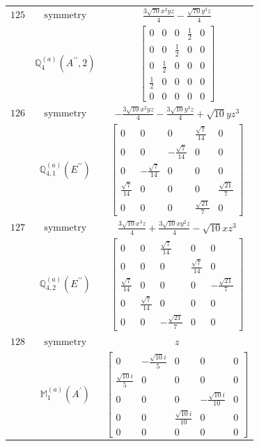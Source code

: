\documentclass[fleqn,8pt,landscape]{jsarticle}
\begin{document}
\begin{longtable}{ccc}
$ 125 $ & $ \text{symmetry} $ & $ \frac{3 \sqrt{70} x^{2} y z}{4} - \frac{\sqrt{70} y^{3} z}{4} $ \\
$  $ & $ \mathbb{Q}_{4}^{(a)}(A^{\prime\prime},2) $ & $ \begin{bmatrix} 0 & 0 & 0 & \frac{1}{2} & 0 \\ 0 & 0 & \frac{1}{2} & 0 & 0 \\ 0 & \frac{1}{2} & 0 & 0 & 0 \\ \frac{1}{2} & 0 & 0 & 0 & 0 \\ 0 & 0 & 0 & 0 & 0 \end{bmatrix} $ \\ \hline
$ 126 $ & $ \text{symmetry} $ & $ - \frac{3 \sqrt{10} x^{2} y z}{4} - \frac{3 \sqrt{10} y^{3} z}{4} + \sqrt{10} y z^{3} $ \\
$  $ & $ \mathbb{Q}_{4,1}^{(a)}(E^{\prime\prime}) $ & $ \begin{bmatrix} 0 & 0 & 0 & \frac{\sqrt{7}}{14} & 0 \\ 0 & 0 & - \frac{\sqrt{7}}{14} & 0 & 0 \\ 0 & - \frac{\sqrt{7}}{14} & 0 & 0 & 0 \\ \frac{\sqrt{7}}{14} & 0 & 0 & 0 & \frac{\sqrt{21}}{7} \\ 0 & 0 & 0 & \frac{\sqrt{21}}{7} & 0 \end{bmatrix} $ \\ \hline
$ 127 $ & $ \text{symmetry} $ & $ \frac{3 \sqrt{10} x^{3} z}{4} + \frac{3 \sqrt{10} x y^{2} z}{4} - \sqrt{10} x z^{3} $ \\
$  $ & $ \mathbb{Q}_{4,2}^{(a)}(E^{\prime\prime}) $ & $ \begin{bmatrix} 0 & 0 & \frac{\sqrt{7}}{14} & 0 & 0 \\ 0 & 0 & 0 & \frac{\sqrt{7}}{14} & 0 \\ \frac{\sqrt{7}}{14} & 0 & 0 & 0 & - \frac{\sqrt{21}}{7} \\ 0 & \frac{\sqrt{7}}{14} & 0 & 0 & 0 \\ 0 & 0 & - \frac{\sqrt{21}}{7} & 0 & 0 \end{bmatrix} $ \\ \hline
$ 128 $ & $ \text{symmetry} $ & $ z $ \\
$  $ & $ \mathbb{M}_{1}^{(a)}(A^{\prime}) $ & $ \begin{bmatrix} 0 & - \frac{\sqrt{10} i}{5} & 0 & 0 & 0 \\ \frac{\sqrt{10} i}{5} & 0 & 0 & 0 & 0 \\ 0 & 0 & 0 & - \frac{\sqrt{10} i}{10} & 0 \\ 0 & 0 & \frac{\sqrt{10} i}{10} & 0 & 0 \\ 0 & 0 & 0 & 0 & 0 \end{bmatrix} $ \\ \hline

\end{longtable}
\end{document}
